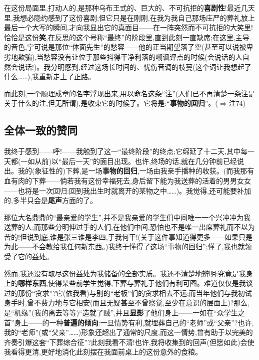在这份局面里,打动人的,是那种乌布王式的、巨大的、不可抗拒的\textbf{喜剧性}!最近几天里,我想必隐约感到了这份喜剧;但它只是在刚刚,在我为我自己那场庄严的葬礼放上最后一个大写的瞬间,才向我显出它的真面目——在一阵突然而不可抗拒的大笑里!恰恰是这份\textbf{笑},在反思的这个号称“最终”的阶段里,直到此刻一直缺席;在这里,主导的音色,宁可说是那位“体面先生”的愁容——他的正当期望落了空(甚至可以说被卑劣地欺骗),当愁容没有让位于那些抖得干净利落的嘲讽评点的时候(会说话的人自然会说话!)。我分明感到,经过这场长时间的、忧伤音调的枝蔓(这个词让我想起了什么……),我重新走上了正路。

而此刻,一个顺理成章的名字浮现出来,用以命名这条“注”(人们已不再清楚一条注是关于什么的注,但无所谓),是收束它的时候了。它将是:“\textbf{事物的回归}”。($\Rightarrow$注74)

\subsection{全体一致的赞同}


我终于感到——呼!——我触到了这一“最终阶段”的终点;它绵延了十二天,其中每一天都(一如从前)以“最后一天”的面目出现。也许,终场的话,就在几分钟前已经说出。我的(象征性的)下葬,是一场\textbf{事物的回归},一场由我亲手播种的收获。(而我那有血有肉\dmark{}的下葬——倘若我有这份幸福死去,身后留下能为我送葬的活着的男男女女——也将是一次回归:回到我出生时就离开的某物之中……)。我觉得,还可能要补加的,多半只会是\textbf{尾声}方面的了。

那位大名鼎鼎的“最亲爱的学生”,并不是我亲爱的学生们中间唯一一个兴冲冲为我送葬的人;而那些分明伸过手的人们,在他们中间,恐怕也不是唯一出席葬礼而不以为苦的!但说到底,谁是张三谁是李四,于我何干!(关于这件事知道得更多——如果只是为此——不会教给我任何新东西。)我终于懂得了这场“事物的回归”;懂了,我也就领受了它的益处。

然而,我还没有取尽这份益处为我储备的全部实质。我还不清楚地辨明:究竟是我身上的\textbf{哪样东西},使得某些前学生觉得,下葬与葬礼于他们有利可图。难道仅仅是我谈过的那份“贪求”?它(依我看)与别的“老板”们的贪求相去不远;而当年他们与我初试身手时,曾不费力地与它相安(而且无疑甚至不曾察觉,至少在意识的层面上)?那么,是“机缘”(我的离去等等)“造就了贼”,并且\textbf{显影}了他们身上——一如在“众学生之首”身上——的一种\textbf{普遍的倾向}:一旦情势有利,就埋葬自己的“老师”或“父亲”?也许,我的“老师”(或“父亲”……)形象还超出了通常的尺度,而这一情势,曾有助于以完美的齐奏引爆这套“下葬综合征”?此刻我看不清!也许,我将收集到的回声(但愿如此)会使我看得更清,更好地消化此刻摆在我面前桌上的这份意外的食粮。

